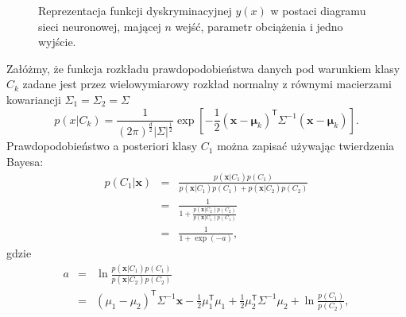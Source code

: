 \documentclass[11pt]{book}
\theoremstyle{definition}
\begin{document}
\begin{SCfigure}
	\centering
	
	\caption{ Reprezentacja funkcji dyskryminacyjnej $y(x)$ w postaci diagramu sieci neuronowej, mającej $n$ wejść, parametr obciążenia i jedno wyjście.  }
\end{SCfigure}
%
Załóżmy, że funkcja rozkładu prawdopodobieństwa danych pod warunkiem klasy $C_k$ zadane jest przez wielowymiarowy rozkład normalny z równymi macierzami kowariancji $ \Sigma_1 = \Sigma_2 = \Sigma$
%
\begin{equation}
p(x|C_k) = \frac{1}{\left(2 \pi\right)^{\frac{d}{2}} \left| \Sigma \right|^{\frac{1}{2}}} \exp \left[ -\frac{1}{2} \left(\mathbf{x} - \mathbf{\mu}_k\right)^\mathsf{T} \Sigma^{-1} \left(\mathbf{x} - \mathbf{\mu}_k \right) \right].
\end{equation}
%
Prawdopodobieństwo a posteriori klasy $C_1$ można zapisać używając twierdzenia Bayesa:
%
\begin{eqnarray}
p(C_1 | \mathbf{x}) &=& \frac{p(\mathbf{x}|C_1) p(C_1)}{ p(\mathbf{x}|C_1) p(C_1) + p(\mathbf{x}|C_2)p(C_2)} \nonumber\\
&=& \frac{1}{1 + \frac{p(\mathbf{x}|C_2)p(C_2)}{p(\mathbf{x}|C_1)p(C_1)}} \nonumber\\ 
&=& \frac{1}{1 + \exp(-a)},
\end{eqnarray}
%
gdzie
%
\begin{eqnarray}
a &=& \ln \frac{p(\mathbf{x}|C_1)p(C_1)}{p(\mathbf{x}|C_2)p(C_2)} \nonumber \\
&=& \left( \mu_1 - \mu_2 \right)^{\mathsf{T}} \Sigma^{-1} \mathbf{x}  - \frac{1}{2} \mu_1^\mathsf{T}\mu_1 + \frac{1}{2} \mu_2^\mathsf{T} \Sigma^{-1} \mu_2 + \ln \frac{p(C_1)}{p(C_2)},
\end{eqnarray}
\end{document}
